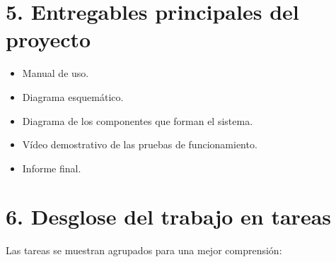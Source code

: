 \documentclass[11pt]{charter}
\begin{document}
\section{5. Entregables principales del proyecto}
\label{sec:entregables}

\begin{itemize}
\item Manual de uso.
\item Diagrama esquemático.
\item Diagrama de los componentes que forman el sistema.
\item Vídeo demostrativo de las pruebas de funcionamiento.
\item Informe final.

\end{itemize}

\section{6. Desglose del trabajo en tareas}
\label{sec:wbs}
Las tareas se muestran agrupados para una mejor comprensión:
\end{document}
